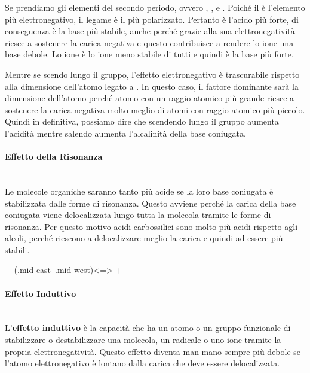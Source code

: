 Se prendiamo gli elementi del secondo periodo, ovvero , ,  e . Poiché il  è l'elemento più elettronegativo, il legame  è il più polarizzato. Pertanto  è l'acido più forte, di conseguenza  è la base più stabile, anche perché grazie alla sua elettronegatività riesce a sostenere la carica negativa e questo contribuisce a rendere lo ione  una base debole. Lo ione  è lo ione meno stabile di tutti e quindi è la base più forte.

Mentre se scendo lungo il gruppo, l'effetto elettronegativo è trascurabile rispetto alla dimensione dell'atomo legato a . In questo caso, il fattore dominante sarà la dimensione dell'atomo perché atomo con un raggio atomico più grande riesce a sostenere la carica negativa molto meglio di atomi con raggio atomico più piccolo. Quindi in definitiva, possiamo dire che scendendo lungo il gruppo aumenta l'acidità mentre salendo aumenta l'alcalinità della base coniugata.

\paragraph{Effetto della Risonanza}\mbox{}\\
Le molecole organiche saranno tanto più acide se la loro base coniugata è stabilizzata dalle forme di risonanza. Questo avviene perché la carica della base coniugata viene delocalizzata lungo tutta la molecola tramite le forme di risonanza. Per questo motivo acidi carbossilici sono molto più acidi rispetto agli alcoli, perché riescono a delocalizzare meglio la carica e quindi ad essere più stabili.

\begingroup
{}
\begin{reaction}
	 +  \arrow(.mid east--.mid west){<=>}
	 + 
\end{reaction}
\endgroup


\paragraph{Effetto Induttivo}\mbox{}\\
L'\textbf{effetto induttivo} è la capacità che ha un atomo o un gruppo funzionale di stabilizzare o destabilizzare una molecola, un radicale o uno ione tramite la propria elettronegatività. Questo effetto diventa man mano sempre più debole se l'atomo elettronegativo è lontano dalla carica che deve essere delocalizzata.

